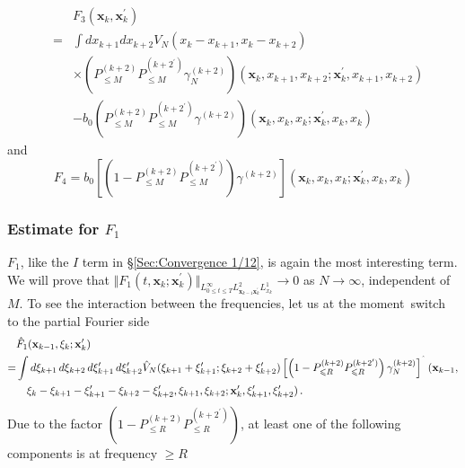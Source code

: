\documentclass[12pt,letterpaper,leqno]{amsart}
\theoremstyle{plain}
\numberwithin{equation}{section}
\numberwithin{theorem}{section}
\numberwithin{proposition}{section}
\numberwithin{lemma}{section}
\numberwithin{corollary}{section}
\begin{document}
\begin{eqnarray*}
&&F_{3}(\mathbf{x}_{k},\mathbf{x}_{k}^{\prime }) \\
&=&\int dx_{k+1}dx_{k+2}V_{N}(x_{k}-x_{k+1},x_{k}-x_{k+2}) \\
&&\times \left( P_{\leqslant M}^{(k+2)}P_{\leqslant M}^{(k+2^{\prime
})}\gamma _{N}^{(k+2)}\right) (\mathbf{x}_{k},x_{k+1},x_{k+2};\mathbf{x}%
_{k}^{\prime },x_{k+1},x_{k+2}) \\
&&-b_{0}\left( P_{\leqslant M}^{(k+2)}P_{\leqslant M}^{(k+2^{\prime
})}\gamma ^{(k+2)}\right) (\mathbf{x}_{k},x_{k},x_{k};\mathbf{x}_{k}^{\prime
},x_{k},x_{k})
\end{eqnarray*}%
and 
\begin{equation*}
F_{4}=b_{0}\left[ \left( 1-P_{\leqslant M}^{(k+2)}P_{\leqslant
M}^{(k+2^{\prime })}\right) \gamma ^{(k+2)}\right] (\mathbf{x}%
_{k},x_{k},x_{k};\mathbf{x}_{k}^{\prime },x_{k},x_{k})
\end{equation*}

\subsubsection{Estimate for $F_{1}$}

$F_{1}$, like the $I$ term in \S \ref{Sec:Convergence 1/12}, is again the
most interesting term. We will prove that $\Vert F_{1}(t,\mathbf{x}_{k};%
\mathbf{x}_{k}^{\prime })\Vert _{L_{0\leq t\leq T}^{\infty }L_{\mathbf{x}%
_{k-1}\mathbf{x}_{k}^{\prime }}^{2}L_{x_{k}}^{1}}\rightarrow 0$ as $%
N\rightarrow \infty $, independent of $M$. To see the interaction between
the frequencies, let us at the moment\ switch to the partial Fourier side 
\begin{align*}
& \hat{F}_{1}(\mathbf{x}_{k-1},\xi _{k};\mathbf{x}_{k}^{\prime }) \\
=& \int d\xi _{k+1}\,d\xi _{k+2}\,d\xi _{k+1}^{\prime }\,d\xi _{k+2}^{\prime
}\hat{V}_{N}(\xi _{k+1}+\xi _{k+1}^{\prime };\xi _{k+2}+\xi _{k+2}^{\prime })%
\left[ \left( 1-P_{\leqslant R}^{(k+2)}P_{\leqslant R}^{(k+2^{\prime
})}\right) \gamma _{N}^{(k+2)}\right] ^{\symbol{94}}(\mathbf{x}_{k-1}, \\
& \quad \xi _{k}-\xi _{k+1}-\xi _{k+1}^{\prime }-\xi _{k+2}-\xi
_{k+2}^{\prime },\xi _{k+1},\xi _{k+2};\mathbf{x}_{k}^{\prime },\xi
_{k+1}^{\prime },\xi _{k+2}^{\prime })\,.
\end{align*}%
Due to the factor $\left( 1-P_{\leqslant R}^{(k+2)}P_{\leqslant
R}^{(k+2^{\prime })}\right) $, at least one of the following components is
at frequency $\geqslant R$
\end{document}
